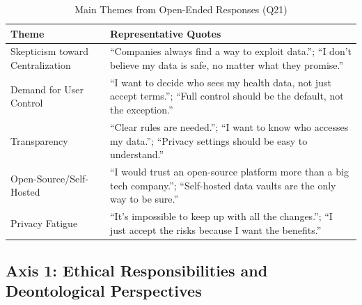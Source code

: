 		\begin{table}[ht]
			\centering
			\begin{tabular}{p{3.5cm}p{11cm}}
				\toprule
				\textbf{Theme} & \textbf{Representative Quotes} \\
				\midrule
				Skepticism toward Centralization & “Companies always find a way to exploit data.”; “I don’t believe my data is safe, no matter what they promise.” \\
				Demand for User Control & “I want to decide who sees my health data, not just accept terms.”; “Full control should be the default, not the exception.” \\
				Transparency & “Clear rules are needed.”; “I want to know who accesses my data.”; “Privacy settings should be easy to understand.” \\
				Open-Source/Self-Hosted & “I would trust an open-source platform more than a big tech company.”; “Self-hosted data vaults are the only way to be sure.” \\
				Privacy Fatigue & “It’s impossible to keep up with all the changes.”; “I just accept the risks because I want the benefits.” \\
				\bottomrule
			\end{tabular}
			\caption{Main Themes from Open-Ended Responses (Q21)}
			\label{tab:qualitative_themes}
		\end{table}
\subsection{Axis 1: Ethical Responsibilities and Deontological Perspectives}
